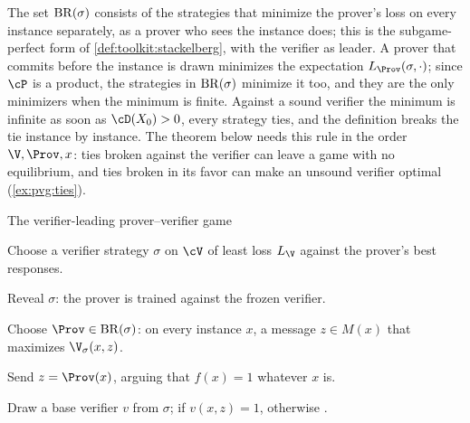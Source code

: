 \begin{refsection}
The set $\mathrm{BR}(\sigma)$ consists of the strategies that minimize the prover's loss on every instance separately, as a prover who sees the instance does; this is the subgame-perfect form of \cref{def:toolkit:stackelberg}, with the verifier as leader. A prover that commits before the instance is drawn minimizes the expectation $L_\Prov(\sigma,\cdot)$; since $\cP$ is a product, the strategies in $\mathrm{BR}(\sigma)$ minimize it too, and they are the only minimizers when the minimum is finite. Against a sound verifier the minimum is infinite as soon as $\cD(X_0)>0$, every strategy ties, and the definition breaks the tie instance by instance. The theorem below needs this rule in the order $\V,\Prov,x$: ties broken against the verifier can leave a game with no equilibrium, and ties broken in its favor can make an unsound verifier optimal (\cref{ex:pvg:ties}).

\begin{protocol}{The verifier-leading prover--verifier game}\label{prot:pvg:game}
\item[\act{V}] Choose a verifier strategy $\sigma$ on $\cV$ of least loss $L_\V$ against the prover's best responses.
\item[\msg{V}{P}] Reveal $\sigma$: the prover is trained against the frozen verifier.
\item[\act{P}] Choose $\Prov\in\pvgBR(\sigma)$: on every instance $x$, a message $z\in M(x)$ that maximizes $\V_\sigma(x,z)$.
\item[\msg{P}{V}] Send $z=\Prov(x)$, arguing that $f(x)=1$ whatever $x$ is.
\item[\act{V}] Draw a base verifier $v$ from $\sigma$; \acc{} if $v(x,z)=1$, otherwise \rej.
\end{protocol}


\end{refsection}
